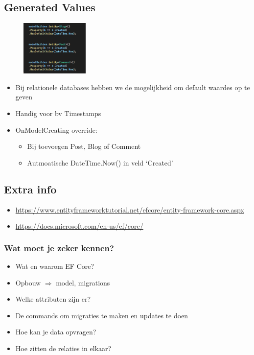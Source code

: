 \documentclass{article}
\begin{document}
\subsection{Generated Values}

\begin{figure}[H]
    \centering
    \includegraphics[width=0.3\textwidth]{efcore-generatedvalues.png}
    \caption{}
\end{figure}


\begin{itemize}
    \item Bij relationele databases hebben we de mogelijkheid om default waardes op te geven
    \item Handig voor bv Timestamps
    \item OnModelCreating override:
    \begin{itemize}
        \item Bij toevoegen Post, Blog of Comment
        \item Autmoatische DateTime.Now() in veld `Created'
    \end{itemize}
\end{itemize}

\subsection{Extra info}

\begin{itemize}
    \item \url{https://www.entityframeworktutorial.net/efcore/entity-framework-core.aspx}
    \item \url{https://docs.microsoft.com/en-us/ef/core/}
\end{itemize}

\subsubsection{Wat moet je zeker kennen?}

\begin{itemize}
    \item Wat en waarom EF Core?
    \item Opbouw $\Rightarrow$ model, migrations
    \item Welke attributen zijn er?
    \item De commands om migraties te maken en updates te doen
    \item Hoe kan je data opvragen?
    \item Hoe zitten de relaties in elkaar?
\end{itemize}
\end{document}
